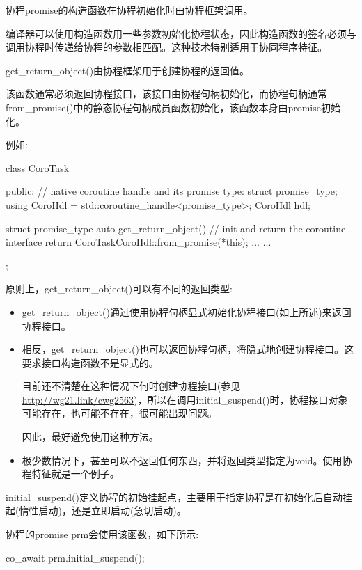 
协程promise的构造函数在协程初始化时由协程框架调用。

编译器可以使用构造函数用一些参数初始化协程状态，因此构造函数的签名必须与调用协程时传递给协程的参数相匹配。这种技术特别适用于协同程序特征。


get\_return\_object()由协程框架用于创建协程的返回值。

该函数通常必须返回协程接口，该接口由协程句柄初始化，而协程句柄通常from\_promise()中的静态协程句柄成员函数初始化，该函数本身由promise初始化。

例如:

\begin{cpp}
class CoroTask {
	public:
	// native coroutine handle and its promise type:
	struct promise_type;
	using CoroHdl = std::coroutine_handle<promise_type>;
	CoroHdl hdl;

	struct promise_type {
		auto get_return_object() { // init and return the coroutine interface
			return CoroTask{CoroHdl::from_promise(*this)};
		}
		...
	}
	...
};
\end{cpp}

原则上，get\_return\_object()可以有不同的返回类型:

\begin{itemize}
\item
get\_return\_object()通过使用协程句柄显式初始化协程接口(如上所述)来返回协程接口。

\item
相反，get\_return\_object()也可以返回协程句柄，将隐式地创建协程接口。这要求接口构造函数不是显式的。

目前还不清楚在这种情况下何时创建协程接口(参见\url{http://wg21.link/cwg2563})，所以在调用initial\_suspend()时，协程接口对象可能存在，也可能不存在，很可能出现问题。

因此，最好避免使用这种方法。

\item
极少数情况下，甚至可以不返回任何东西，并将返回类型指定为void。使用协程特征就是一个例子。
\end{itemize}


initial\_suspend()定义协程的初始挂起点，主要用于指定协程是在初始化后自动挂起(惰性启动)，还是立即启动(急切启动)。

协程的promise prm会使用该函数，如下所示:

\begin{cpp}
co_await prm.initial_suspend();
\end{cpp}

